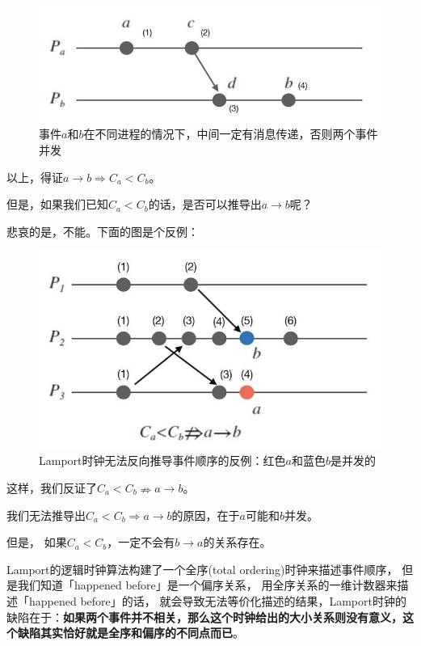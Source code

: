 \documentclass[cn,11pt,chinese]{elegantbook}
\begin{document}
\begin{figure}
\centering
\includegraphics{images/appendix-a-11.jpeg}
\caption{事件\(a\)和\(b\)在不同进程的情况下，中间一定有消息传递，否则两个事件并发}
\end{figure}

以上，得证\(a \rightarrow b \Rightarrow C_a < C_b\)。

但是，如果我们已知\(C_a < C_b\)的话，是否可以推导出\(a \rightarrow b\)呢？

悲哀的是，不能。下面的图是个反例：

\begin{figure}
\centering
\includegraphics{images/appendix-a-12.jpeg}
\caption{Lamport时钟无法反向推导事件顺序的反例：红色\(a\)和蓝色\(b\)是并发的}
\end{figure}

这样，我们反证了\(C_a < C_b \nRightarrow a \rightarrow b\)。

我们无法推导出\(C_a < C_b \Rightarrow a \rightarrow b\)的原因，在于\(a\)可能和\(b\)并发。

但是， 如果\(C_a < C_b\)，一定不会有\(b \rightarrow a\)的关系存在。

Lamport的逻辑时钟算法构建了一个全序(total ordering)时钟来描述事件顺序，
但是我们知道「happened before」是一个偏序关系，
用全序关系的一维计数器来描述「happened before」的话，
就会导致无法等价化描述的结果，Lamport时钟的缺陷在于：\textbf{如果两个事件并不相关，那么这个时钟给出的大小关系则没有意义，这个缺陷其实恰好就是全序和偏序的不同点而已}。
\end{document}
